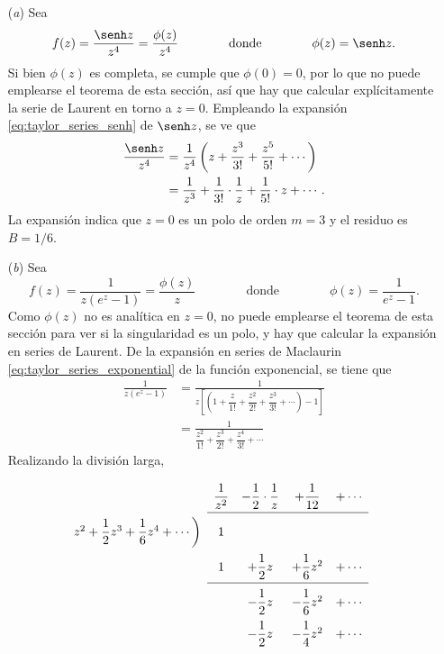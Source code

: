 \documentclass[a4paper]{report}
\begin{document}
\begin{enumerate}
 \item[(\textit{a})] Sea 
 \[
  f(z)=\frac{\senh z}{z^4}=\frac{\phi(z)}{z^4}
  \qquad\qquad\textrm{donde}\qquad\qquad
  \phi(z)=\senh z.
 \]
 Si bien \(\phi(z)\) es completa, se cumple que \(\phi(0)=0\), por lo que no puede emplearse el teorema de esta sección, así que hay que calcular explícitamente la serie de Laurent en torno a \(z=0\). Empleando la expansión \ref{eq:taylor_series_senh} de \(\senh z\), se ve que 
 \begin{align*}
  \frac{\senh z}{z^4}&=\frac{1}{z^4}\left(z+\frac{z^3}{3!}+\frac{z^5}{5!}+\cdots\right)\\ 
    &=\frac{1}{z^3}+\frac{1}{3!}\cdot\frac{1}{z}+\frac{1}{5!}\cdot z+\cdots. 
 \end{align*}
 La expansión indica que \(z=0\) es un polo de orden \(m=3\) y el residuo es \(B=1/6\).
 \item[(\textit{b})] Sea 
 \[
  f(z)=\frac{1}{z(e^z-1)}=\frac{\phi(z)}{z}
  \qquad\qquad\textrm{donde}\qquad\qquad
  \phi(z)=\frac{1}{e^z-1}.
 \]
 Como \(\phi(z)\) no es analítica en \(z=0\), no puede emplearse el teorema de esta sección para ver si la singularidad es un polo, y hay que calcular la expansión en series de Laurent. De la expansión en series de Maclaurin \ref{eq:taylor_series_exponential} de la función exponencial, se tiene que 
 \begin{align*}
  \frac{1}{z(e^z-1)}&=\frac{1}{z\left[\left(1+\dfrac{z}{1!}+\dfrac{z^2}{2!}+\dfrac{z^3}{3!}+\cdots\right)-1\right]}\\
   &=\frac{1}{\dfrac{z^2}{1!}+\dfrac{z^3}{2!}+\dfrac{z^4}{3!}+\cdots}
 \end{align*}
 Realizando la división larga,
\[
\setlength\extrarowheight{10pt}
\begin{array}[t]{cccccc}
                       & \dfrac{1}{z^2} & -\dfrac{1}{2}\cdot\dfrac{1}{z} & +\dfrac{1}{12} & +\cdots&\\[\medskipamount]
\cline{2-5}
z^2+\dfrac{1}{2}z^3+
\dfrac{1}{6}z^4+\cdots 
                \bigg) & 1  &   &  &  &\\
                       & 1  & +\dfrac{1}{2}z & +\dfrac{1}{6}z^2 & +\cdots &\\[\medskipamount]
\cline{2-5}
                       &    & -\dfrac{1}{2}z &  -\dfrac{1}{6}z^2 & +\cdots &\\
                       &    & -\dfrac{1}{2}z &  -\dfrac{1}{4}z^2 & +\cdots &\\[\medskipamount]

\end{array}\]
\end{enumerate}
\end{document}
